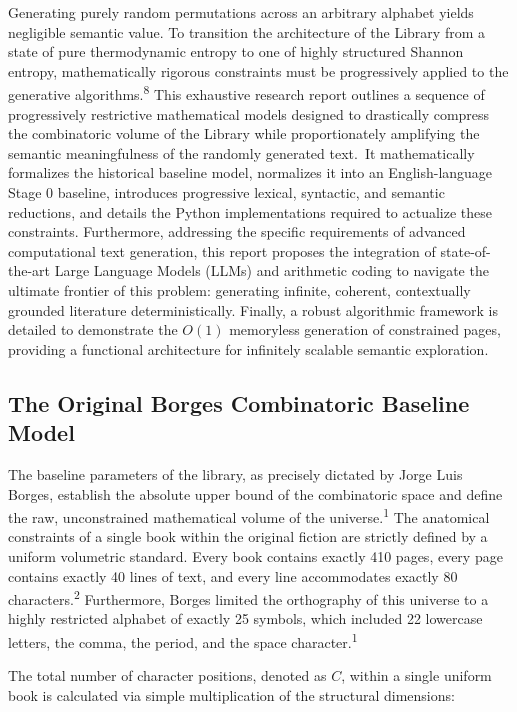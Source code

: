 \documentclass[
  11pt,
  a4paper,
]{article}
\begin{document}
Generating purely random permutations across an arbitrary alphabet yields negligible semantic value. To transition the architecture of the Library from a state of pure thermodynamic entropy to one of highly structured Shannon entropy, mathematically rigorous constraints must be progressively applied to the generative algorithms.\textsuperscript{8} This exhaustive research report outlines a sequence of progressively restrictive mathematical models designed to drastically compress the combinatoric volume of the Library while proportionately amplifying the semantic meaningfulness of the randomly generated text.\ It mathematically formalizes the historical baseline model, normalizes it into an English-language Stage 0 baseline, introduces progressive lexical, syntactic, and semantic reductions, and details the Python implementations required to actualize these constraints. Furthermore, addressing the specific requirements of advanced computational text generation, this report proposes the integration of state-of-the-art Large Language Models (LLMs) and arithmetic coding to navigate the ultimate frontier of this problem: generating infinite, coherent, contextually grounded literature deterministically. Finally, a robust algorithmic framework is detailed to demonstrate the \(O(1)\) memoryless generation of constrained pages, providing a functional architecture for infinitely scalable semantic exploration.

\subsection{The Original Borges Combinatoric Baseline Model}\label{the-original-borges-combinatoric-baseline-model}

The baseline parameters of the library, as precisely dictated by Jorge Luis Borges, establish the absolute upper bound of the combinatoric space and define the raw, unconstrained mathematical volume of the universe.\textsuperscript{1} The anatomical constraints of a single book within the original fiction are strictly defined by a uniform volumetric standard. Every book contains exactly 410 pages, every page contains exactly 40 lines of text, and every line accommodates exactly 80 characters.\textsuperscript{2} Furthermore, Borges limited the orthography of this universe to a highly restricted alphabet of exactly 25 symbols, which included 22 lowercase letters, the comma, the period, and the space character.\textsuperscript{1}

The total number of character positions, denoted as \(C\), within a single uniform book is calculated via simple multiplication of the structural dimensions:
\end{document}

